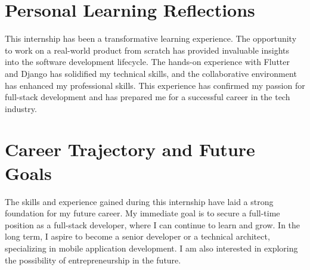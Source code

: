 \section{Personal Learning Reflections}
This internship has been a transformative learning experience. The opportunity to work on a real-world product from scratch has provided invaluable insights into the software development lifecycle. The hands-on experience with Flutter and Django has solidified my technical skills, and the collaborative environment has enhanced my professional skills. This experience has confirmed my passion for full-stack development and has prepared me for a successful career in the tech industry.

\section{Career Trajectory and Future Goals}
The skills and experience gained during this internship have laid a strong foundation for my future career. My immediate goal is to secure a full-time position as a full-stack developer, where I can continue to learn and grow. In the long term, I aspire to become a senior developer or a technical architect, specializing in mobile application development. I am also interested in exploring the possibility of entrepreneurship in the future.